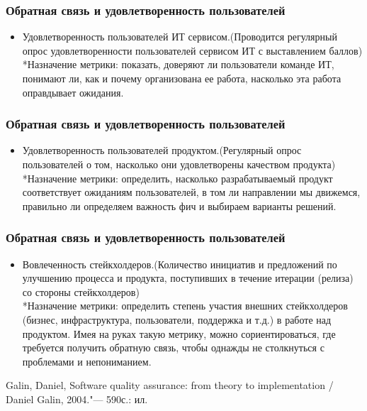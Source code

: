 \documentclass{../industrial-development}
\begin{document}
	\begin{frame} \frametitle{Обратная связь и удовлетворенность пользователей}
		\begin{itemize}
			\item Удовлетворенность пользователей ИТ сервисом.(Проводится регулярный опрос удовлетворенности пользователей сервисом ИТ с выставлением баллов)
			\\*Назначение метрики: показать, доверяют ли пользователи команде ИТ, понимают ли, как и почему организована ее работа, насколько эта работа оправдывает ожидания. 
		\end{itemize}
	\end{frame}

	\begin{frame} \frametitle{Обратная связь и удовлетворенность пользователей}
		\begin{itemize}
			\item Удовлетворенность пользователей продуктом.(Регулярный опрос пользователей о том, насколько они удовлетворены качеством продукта)
			\\*Назначение метрики: определить, насколько разрабатываемый продукт соответствует ожиданиям пользователей, в том ли направлении мы движемся, правильно ли определяем важность фич и выбираем варианты решений. 
		\end{itemize}
	\end{frame}
	
		\begin{frame} \frametitle{Обратная связь и удовлетворенность пользователей}
		\begin{itemize}
			\item Вовлеченность стейкхолдеров.(Количество инициатив и предложений по улучшению процесса и продукта, поступивших в течение итерации (релиза) со стороны стейкхолдеров)
			\\*Назначение метрики: определить степень участия внешних стейкхолдеров (бизнес, инфраструктура, пользователи, поддержка и т.д.) в работе над продуктом. Имея на руках такую метрику, можно сориентироваться, где требуется получить обратную связь, чтобы однажды не столкнуться с проблемами и непониманием.
		\end{itemize}
	\end{frame}


	\begin{thebibliography}{99}
		 Galin, Daniel, Software quality assurance: from theory to implementation / Daniel Galin, 2004."--- 590с.: ил.
	\end{thebibliography}
	
\end{document}
